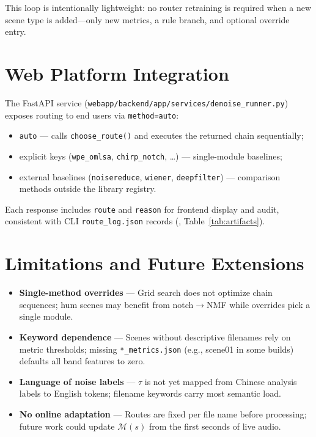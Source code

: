 This loop is intentionally lightweight: no router retraining is required when a new scene type is added---only new metrics, a rule branch, and optional override entry.

\section{Web Platform Integration}
\label{sec:routing_web}

The FastAPI service (\texttt{webapp/backend/app/services/denoise\_runner.py}) exposes routing to end users via \texttt{method=auto}:
\begin{itemize}
  \item \texttt{auto} --- calls \texttt{choose\_route()} and executes the returned chain sequentially;
  \item explicit keys (\texttt{wpe\_omlsa}, \texttt{chirp\_notch}, \ldots) --- single-module baselines;
  \item external baselines (\texttt{noisereduce}, \texttt{wiener}, \texttt{deepfilter}) --- comparison methods outside the library registry.
\end{itemize}
Each response includes \texttt{route} and \texttt{reason} for frontend display and audit, consistent with CLI \texttt{route\_log.json} records (, Table~\ref{tab:artifacts}).

\section{Limitations and Future Extensions}
\label{sec:routing_limits}

\begin{itemize}
  \item \textbf{Single-method overrides} --- Grid search does not optimize chain sequences; hum scenes may benefit from notch$\rightarrow$NMF while overrides pick a single module.
  \item \textbf{Keyword dependence} --- Scenes without descriptive filenames rely on metric thresholds; missing \texttt{*\_metrics.json} (e.g., scene01 in some builds) defaults all band features to zero.
  \item \textbf{Language of noise labels} --- $\tau$ is not yet mapped from Chinese analysis labels to English tokens; filename keywords carry most semantic load.
  \item \textbf{No online adaptation} --- Routes are fixed per file name before processing; future work could update $\mathcal{M}(s)$ from the first seconds of live audio.
\end{itemize}

